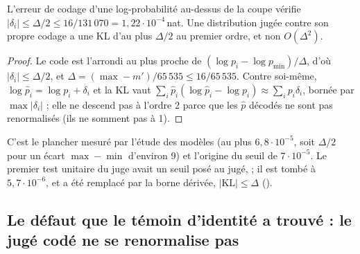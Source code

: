 \begin{lemme}\label{lem:t2r-plancher}
L'erreur de codage d'une log-probabilité au-dessus de la coupe vérifie $|\delta_i| \le \Delta/2 \le 16/131\,070 = 1{,}22\cdot10^{-4}$\,nat. Une distribution jugée contre son propre codage a une KL d'au plus $\Delta/2$ au premier ordre, et non $O(\Delta^2)$.
\end{lemme}

\begin{proof}
Le code est l'arrondi au plus proche de $(\log p_i - \log p_{\min})/\Delta$, d'où $|\delta_i| \le \Delta/2$, et $\Delta = (\max - m')/65\,535 \le 16/65\,535$. Contre soi-même, $\log\hat p_i = \log p_i + \delta_i$ et la KL vaut $\sum_i \hat p_i(\log \hat p_i - \log p_i) \approx \sum_i p_i\delta_i$, bornée par $\max|\delta_i|$ ; elle ne descend pas à l'ordre 2 parce que les $\hat p$ décodés ne sont pas renormalisés (ils ne somment pas à 1).
\end{proof}

C'est le plancher mesuré par l'étude des modèles (au plus $6{,}8\cdot10^{-5}$, soit $\Delta/2$ pour un écart $\max - \min$ d'environ 9) et l'origine du seuil de $7\cdot10^{-5}$. Le premier test unitaire du juge avait un seuil posé au jugé,  ; il est tombé à $5{,}7\cdot10^{-6}$, et a été remplacé par la borne dérivée, $|\mathrm{KL}| \le \Delta$ ().

\subsection{Le défaut que le témoin d'identité a trouvé : le jugé codé ne se renormalise pas}\label{sec:t2r-renorm}

